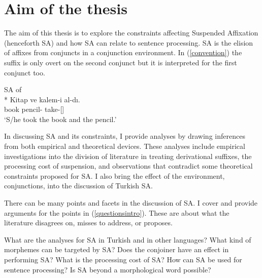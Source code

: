 \section{Aim of the thesis}

The aim of this thesis is to explore the constraints affecting Suspended Affixation (henceforth SA) and how SA can relate to sentence processing. SA is the elision of affixes from conjuncts in a conjunction environment. In (\ref{convention}) the suffix {\Acc} is only overt on the second conjunct but it is interpreted for the first conjunct too.

\begin{exe}
\ex \label{convention} SA of {\Acc}\\*
\gll Kitap ve kalem-i al-dı. \\ book {\And} pencil-{\Acc} take-{\Pst}[{\Tsg}] \\
\glt `S/he took the book and the pencil.'
\end{exe}

In discussing SA and its constraints, I provide analyses by drawing inferences from both empirical and theoretical devices. These analyses include empirical investigations into the division of literature in treating derivational suffixes, the processing cost of suspension, and observations that contradict some theoretical constraints proposed for SA. I also bring the effect of the environment, conjunctions, into the discussion of Turkish SA.

There can be many points and facets in the discussion of SA. I cover and provide arguments for the points in (\ref{questionsintro}). These are about what the literature disagrees on, misses to address, or proposes.

\begin{exe}
\ex \label{questionsintro}
\begin{xlisti}
    \ex What are the analyses for SA in Turkish and in other languages?
    \ex What kind of morphemes can be targeted by SA?
    \ex Does the conjoiner have an effect in performing SA?
    \ex What is the processing cost of SA?
    \ex How can SA be used for sentence processing?
    \ex Is SA beyond a morphological word possible?  
\end{xlisti}
\end{exe}